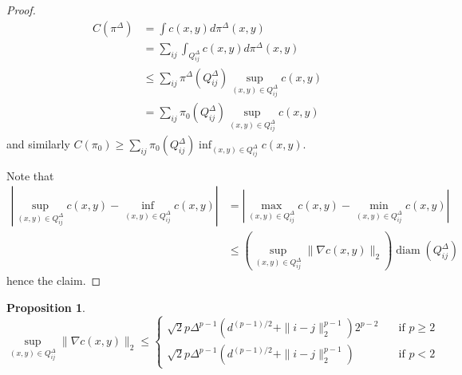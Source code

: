 \documentclass[12pt]{report}
\theoremstyle{definition}
\newtheorem{prop}[defi]{Proposition}
\theoremstyle{remark}
\DeclareMathOperator*{\diam}{diam}
\begin{document}
\begin{proof}
	$$\begin{aligned}C(\pi^{\Delta}) 
&= \int c(x,y) d\pi^\Delta(x,y)\\
&= \sum_{ij} \int_{Q_{ij}^{\Delta}} c(x,y) d\pi^\Delta(x,y)\\
&\leq \sum_{ij} \pi^\Delta(Q_{ij}^{\Delta}) \sup_{(x,y)\in Q_{ij}^{\Delta}} c(x,y)\\
&= \sum_{ij} \pi_0(Q_{ij}^{\Delta}) \sup_{(x,y)\in Q_{ij}^{\Delta}} c(x,y) \end{aligned}$$
and similarly $C(\pi_{0}) \geq \sum_{ij} \pi_0(Q_{ij}^{\Delta}) \inf_{(x,y)\in Q_{ij}^{\Delta}} c(x,y)$.

\noindent Note that 
$$\begin{aligned}\left|\sup_{(x,y)\in Q_{ij}^{\Delta}} c(x,y) - \inf_{(x,y)\in Q_{ij}^{\Delta}} c(x,y)\right| 
&= \left|\max_{(x,y)\in Q_{ij}^{\Delta}} c(x,y) - \min_{(x,y)\in Q_{ij}^{\Delta}} c(x,y)\right|\\
&\leq \left(\sup_{(x,y)\in Q_{ij}^\Delta} \|\nabla c(x,y)\|_2\right)\diam(Q_{ij}^{\Delta})
\end{aligned}$$
hence the claim.
\end{proof}

\begin{prop}\label{prop2}
	$$\sup_{(x,y)\in Q_{ij}^\Delta} \|\nabla c(x,y)\|_2\leq \begin{cases}
\sqrt 2 p \Delta^{p-1}(d^{(p-1)/2}  + \|i-j\|_2^{p-1})2^{p-2} \quad &\text{if } p\geq 2 \\
\sqrt 2 p \Delta^{p-1}(d^{(p-1)/2}  + \|i-j\|_2^{p-1}) \quad &\text{if } p<2
\end{cases} $$
\end{prop}
 
\end{document}
